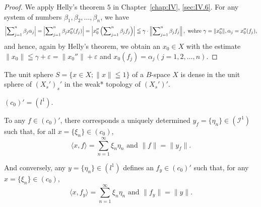 \begin{proof}
 We apply Helly's theorem $5$ in Chapter~\ref{chap:IV}, \ref{sec:IV.6}. For any system of numbers $\beta_{1}, \beta_{2}, \ldots, \beta_{n}$, we have 
\begin{equation}\left| \sum\limits_{j=1} ^{n} \beta_{j} \alpha_{j} \right| = \left| \sum\limits_{j=1} ^{n} \beta_{j} x _{0} ^{\prime \prime} (f _{j}) \right| = \left| x _{0} ^{\prime \prime} \left(\sum\limits_{j=1} ^{n} \beta_{j} f _{j}\right) \right| \leqq \gamma \cdot \left\| \sum\limits_{j=1} ^{n} \beta_{j} f _{j} \right\|, \text{ wehre } \gamma = \| x _{0} ^{\prime \prime} \|, \alpha_{j} = x _{0} ^{\prime \prime} (f _{j}), \notag\end{equation}
and hence, again by Helly's theorem, we obtain an $x_0 \in X$ with the estimate $\| x_0 \| \leqq \gamma + \varepsilon = \| x_0'' \| + \varepsilon$ and $x_0(f_j) = \alpha_j (j = 1, 2, \ldots, n)$. 
\end{proof}

\begin{corollaryu} The unit sphere $S = \{x \in X; \| x \| \leqq 1\}$ of a $B$-space $X$ is dense in the unit sphere of $(X_s')_s'$ in the weak* topology of $(X_s')'$. 
\end{corollaryu}


\label{sec:IV.9}

\begin{example}\label{ex:IV.9.Example.1} $(c_0)' = (l^1)$. 
\end{example}

To any $f \in (c_0)'$, there corresponds a uniquely determined $y_f = \{\eta_n\} \in (\mathcal{I}^1)$ such that, for all $x = \{\xi_n\} \in (c_0)$, 
\begin{equation}\label{eq:IV.9.1}
\langle x, f \rangle = \sum\limits_{n=1} ^{\infty} \xi_{n} \eta_{n} \text{ and } \| f \| = \| y _{f} \|.
\end{equation}

And conversely, any $y = \{\eta_n\} \in (l^1)$ defines an $f_y \in (c_0)'$ such that, for any $x = \{\xi_n\} \in (c_0)$, 
\begin{equation}\tag{1'}\label{eq:IV.9.1'}
\langle x, f _{y} \rangle = \sum\limits_{n=1} ^{\infty} \xi_{n} \eta_{n} \text{ and } \| f _{y} \| = \| y \|.
\end{equation}

